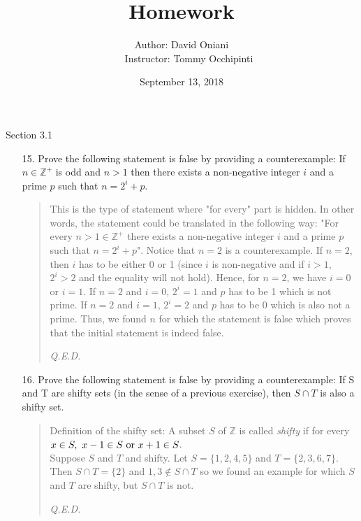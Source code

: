 \documentclass[12pt, a4paper]{article}                      %
\title{\bf{Homework \textnumero 4}}
\author{Author: David Oniani
\\
\ \ \ Instructor: Tommy Occhipinti}
\date{September 13, 2018}
\begin{document}
\maketitle

{\large Section 3.1}
\\

\begin{enumerate}
\item[15.]
Prove the following statement is false by providing a counterexample: If $n \in \mathbb{Z}^+$ is odd
and $n > 1$ then there exists a non-negative integer $i$ and a prime $p$ such that $n = 2^i + p$.
\\

\begin{quote}
This is the type of statement where "for every" part is hidden. In other words,
the statement could be translated in the following way: "For every $n > 1 \in \mathbb{Z}^+$
there exists a non-negative integer $i$ and a prime $p$ such that
$n = 2^i + p$". Notice that $n = 2$ is a counterexample. If $n = 2$, then $i$ has to be either 0 or 1 (since $i$ is non-negative and
if $i > 1$, $2^i > 2$ and the equality will not hold).
Hence, for $n = 2$, we have $i = 0$ or $i = 1$.
If $n = 2$ and $i = 0$, $2^i = 1$ and $p$ has to be 1 which is not prime.
If $n = 2$ and $i = 1$, $2^i = 2$ and $p$ has to be 0 which is also not a prime.
Thus, we found $n$ for which the statement is false which
proves that the initial statement is indeed false.
\begin{flushright}
\textit{Q.E.D.}
\end{flushright}
\end{quote}

\item[16.]
Prove the following statement is false by providing a counterexample:
If S and T are shifty sets (in the sense of a previous exercise), then $S \cap T$ is also a shifty set.
\begin{quote}
Definition of the shifty set: A subset $S$ of $\mathbb{Z}$ is called \textit{shifty} if for every $x \in S, \ x-1 \in S \ \textnormal{or} \ x + 1 \in S$.\\

Suppose $S$ and $T$ and shifty. Let $S = \{1,2,4,5\}$ and $T = \{2,3,6,7\}$.
Then $S \cap T = \{2\}$ and $1, 3 \notin S \cap T$ so we found an example for which
$S$ and $T$ are shifty, but $S \cap T$ is not.
\begin{flushright}
\textit{Q.E.D.}
\end{flushright}
\end{quote}


\end{enumerate}
\end{document}
